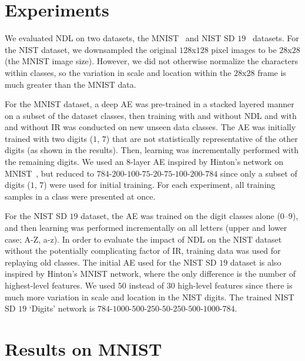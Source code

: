 \documentclass[10pt,conference]{IEEEtran}
\begin{document}
\section{Experiments}
We evaluated NDL on two datasets, the MNIST~\cite{lecun1998gradient} and NIST SD $19$~\cite{grother1995nist} datasets. For the NIST dataset, we downsampled the original $128$x$128$ pixel images to be $28$x$28$ (the MNIST image size). However, we did not otherwise normalize the characters within classes, so the variation in scale and location within the $28$x$28$ frame is much greater than the MNIST data.

For the MNIST dataset, a deep AE was pre-trained in a stacked layered manner on a subset of the dataset classes, then training with and without NDL and with and without IR was conducted on new unseen data classes. The AE was initially trained with two digits ($1$, $7$) that are not statistically representative of the other digits (as shown in the results). Then, learning was incrementally performed with the remaining digits. We used an $8$-layer AE inspired by Hinton's network on MNIST~\cite{hinton2006reducing}, but reduced to $784$-$200$-$100$-$75$-$20$-$75$-$100$-$200$-$784$ since only a subset of digits ($1$, $7$) were used for initial training. For each experiment, all training samples in a class were presented at once. 

For the NIST SD $19$ dataset, the AE was trained on the digit classes alone ($0$--$9$), and then learning was performed incrementally on all letters (upper and lower case; A-Z, a-z). In order to evaluate the impact of NDL on the NIST dataset without the potentially complicating factor of IR, training data was used for replaying old classes. The initial AE used for the NIST SD $19$ dataset is also inspired by Hinton's MNIST network, where the only difference is the number of highest-level features. We used $50$ instead of $30$ high-level features since there is much more variation in scale and location in the NIST digits. The trained NIST SD $19$ `Digits' network is $784$-$1000$-$500$-$250$-$50$-$250$-$500$-$1000$-$784$.

\section{Results on MNIST}
\end{document}
